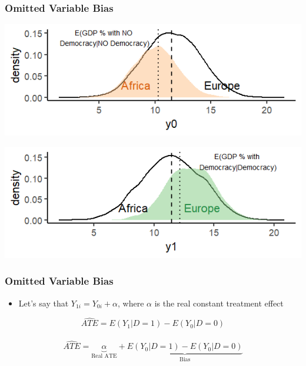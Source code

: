 \documentclass[xcolor=x11names,compress]{beamer}\usepackage[]{graphicx}\usepackage[]{color}
\makeatletter
\def\maxwidth{ %
  \ifdim\Gin@nat@width>\linewidth
    \linewidth
  \else
    \Gin@nat@width
  \fi
}
\newenvironment{knitrout}{}{} %
\renewcommand{\(}{\begin{columns}}
\renewcommand{\)}{\end{columns}}
\newcommand{\<}[1]{\begin{column}{#1}}
\renewcommand{\>}{\end{column}}
\makeatother
\begin{document}
\begin{frame}
\frametitle{Omitted Variable Bias}
\begin{knitrout}
\color{fgcolor}
\includegraphics[width=\maxwidth]{figure/OVB3-1} 

\end{knitrout}

\begin{knitrout}
\color{fgcolor}
\includegraphics[width=\maxwidth]{figure/OVB4-1} 

\end{knitrout}
\end{frame}

\begin{frame}
\frametitle{Omitted Variable Bias}
\begin{itemize}
\item Let's say that $Y_{1i} = Y_{0i} + \alpha$, where $\alpha$ is the real constant treatment effect
\end{itemize}
$$ \hat{ATE} = E(Y_1|D=1) - E(Y_0|D=0)$$ \\ \pause
$$ \hat{ATE} = \underbrace{\alpha}_\text{Real ATE} + \underbrace{E(Y_0|D=1) - E(Y_0|D=0)}_\text{Bias}$$ \\
\end{frame}
\end{document}
